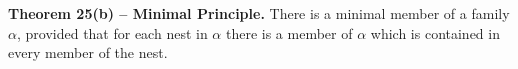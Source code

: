 \textbf{Theorem 25(b) -- Minimal Principle.} There is a minimal member of a family $\alpha$, provided that for each nest in $\alpha$ there is a member of $\alpha$ which is contained in every member of the nest.
